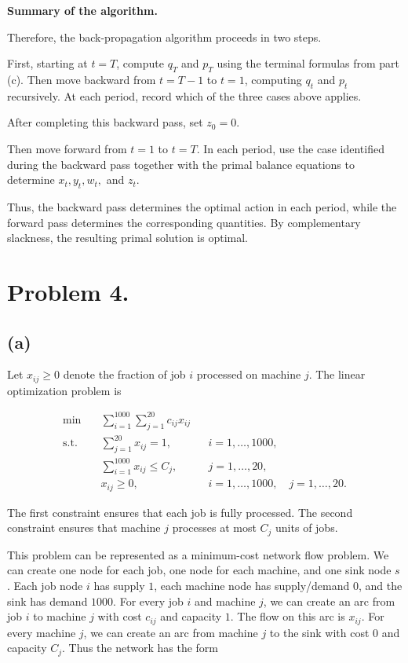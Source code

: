 \documentclass{article}
\begin{document}
\vspace{3mm}


\textbf{Summary of the algorithm.}


Therefore, the back-propagation algorithm proceeds in two steps.

First, starting at $t=T$, compute $q_T$ and $p_T$ using the terminal
formulas from part (c). Then move backward from $t=T-1$ to $t=1$,
computing $q_t$ and $p_t$ recursively. At each period, record which of
the three cases above applies.

After completing this backward pass, set
$
z_0=0.
$

Then move forward from $t=1$ to $t=T$. In each period, use the case
identified during the backward pass together with the primal balance
equations to determine $x_t,y_t,w_t,$ and $z_t$.

Thus, the backward pass determines the optimal action in each period,
while the forward pass determines the corresponding quantities. By
complementary slackness, the resulting primal solution is optimal.


\newpage




\section*{Problem 4.}

\subsection*{(a)}

Let \(x_{ij} \geq 0\) denote the fraction of job \(i\) processed on machine \(j\). The linear optimization problem is

\[
\begin{aligned}
\min \quad
& \sum_{i=1}^{1000}\sum_{j=1}^{20} c_{ij}x_{ij} \\
\text{s.t.}\quad
& \sum_{j=1}^{20} x_{ij} = 1,
&& i=1,\ldots,1000, \\
& \sum_{i=1}^{1000} x_{ij} \leq C_j,
&& j=1,\ldots,20, \\
& x_{ij} \geq 0,
&& i=1,\ldots,1000,\quad j=1,\ldots,20.
\end{aligned}
\]

The first constraint ensures that each job is fully processed. The
second constraint ensures that machine \(j\) processes at most \(C_j\) units of jobs.

This problem can be represented as a minimum-cost network flow problem.
We can create one node for each job, one node for each machine, and one sink
node \(s\). Each job node \(i\) has supply \(1\), each machine node has supply/demand
\(0\), and the sink has demand \(1000\). For every job \(i\) and machine
\(j\), we can create an arc from job \(i\) to machine \(j\) with cost \(c_{ij}\)
and capacity \(1\). The flow on this arc is \(x_{ij}\). For every machine \(j\), we can create an arc from machine \(j\) to the sink
with cost \(0\) and capacity \(C_j\). Thus the network has the form
\end{document}
